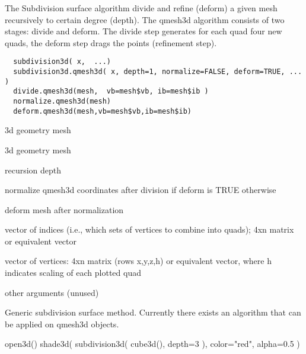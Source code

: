 \begin{Description}\relax
The Subdivision surface algorithm divide and refine (deform) a
given mesh recursively to certain degree (depth).
The qmesh3d algorithm consists of two stages: divide and deform.
The divide step generates for each quad four new quads, the deform
step drags the points (refinement step).
\end{Description}
\begin{Usage}
\begin{verbatim}
  subdivision3d( x,  ...)
  subdivision3d.qmesh3d( x, depth=1, normalize=FALSE, deform=TRUE, ... )
  divide.qmesh3d(mesh,  vb=mesh$vb, ib=mesh$ib )
  normalize.qmesh3d(mesh)
  deform.qmesh3d(mesh,vb=mesh$vb,ib=mesh$ib)
\end{verbatim}
\end{Usage}
\begin{Arguments}
\begin{ldescription}
\item[\code{x}] 3d geometry mesh
\item[\code{mesh}] 3d geometry mesh
\item[\code{depth}] recursion depth
\item[\code{normalize}] normalize qmesh3d coordinates after division if deform is TRUE otherwise
\item[\code{deform}] deform mesh after normalization
\item[\code{ib}] vector of indices (i.e., which sets of vertices to combine
into quads); 4xn matrix or equivalent vector
\item[\code{vb}] vector of vertices: 4xn matrix (rows x,y,z,h) or equivalent
vector, where h indicates scaling of each plotted quad
\item[\code{...}] other arguments (unused)
\end{ldescription}
\end{Arguments}
\begin{Details}\relax
Generic subdivision surface method. Currently there exists
an algorithm that can be applied on qmesh3d objects.
\end{Details}
\begin{SeeAlso}\relax
{}
\end{SeeAlso}
\begin{Examples}
\begin{ExampleCode}
  open3d()
  shade3d( subdivision3d( cube3d(), depth=3 ), color="red", alpha=0.5 )
\end{ExampleCode}
\end{Examples}

